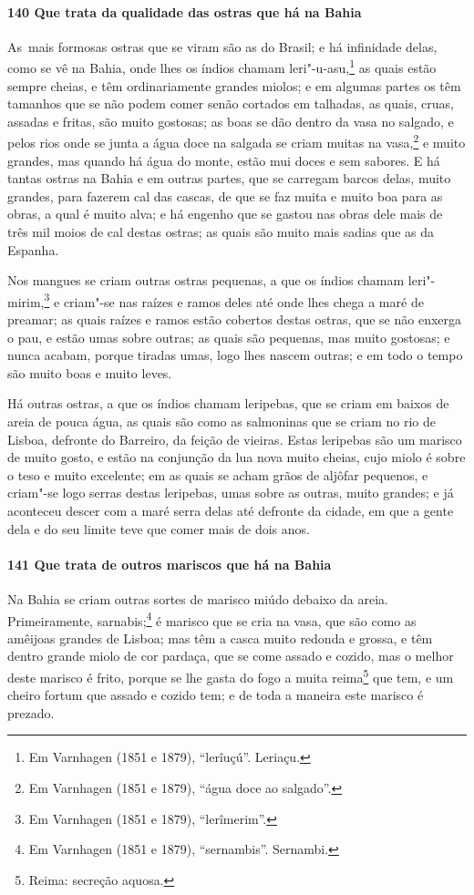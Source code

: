 \begin{linenumbers}
\paragraph{140 Que trata da qualidade das ostras que há na Bahia}\quad
\mbox{As mais} formosas ostras que se viram são as do Brasil; e há infinidade delas, como se vê
na Bahia, onde lhes os índios chamam leri"-u-asu,\footnote{ Em Varnhagen (1851 e 1879),
``lerîuçú''. Leriaçu.} as quais estão sempre cheias, e têm ordinariamente grandes miolos;
e em algumas partes os têm tamanhos que se não podem comer senão cortados em talhadas, as
quais, cruas, assadas e fritas, são muito gostosas; as boas se dão dentro da vasa no
salgado, e pelos rios onde se junta a água doce na salgada se criam muitas na
vasa,\footnote{ Em Varnhagen (1851 e 1879), ``água doce ao salgado''.} e muito grandes,
mas quando há água do monte, estão mui doces e sem sabores. E há tantas ostras na Bahia e
em outras partes, que se carregam barcos delas, muito grandes, para fazerem cal das
cascas, de que se faz muita e muito boa para as obras, a qual é muito alva; e há engenho
que se gastou nas obras dele mais de três mil moios de cal destas ostras; as quais são
muito mais sadias que as da Espanha.

Nos mangues se criam outras ostras pequenas, a que os índios chamam leri"-mirim,\footnote{
Em Varnhagen (1851 e 1879), ``lerîmerim''.} e criam"-se nas raízes e ramos deles até onde
lhes chega a maré de preamar; as quais raízes e ramos estão cobertos destas ostras, que se
não enxerga o pau, e estão umas sobre outras; as quais são pequenas, mas muito gostosas; e
nunca acabam, porque tiradas umas, logo lhes nascem outras; e em todo o tempo são muito
boas e muito leves.

Há outras ostras, a que os índios chamam leripebas, que se criam em baixos de areia de
pouca água, as quais são como as salmoninas que se criam no rio de Lisboa, defronte do
Barreiro, da feição de vieiras. Estas leripebas são um marisco de muito gosto, e estão na
conjunção da lua nova muito cheias, cujo miolo é sobre o teso e muito excelente; em as
quais se acham grãos de aljôfar pequenos, e criam"-se logo serras destas leripebas, umas
sobre as outras, muito grandes; e já aconteceu descer com a maré serra delas até defronte
da cidade, em que a gente dela e do seu limite teve que comer mais de dois anos.

\paragraph{141 Que trata de outros mariscos que há na Bahia}\quad
Na Bahia se criam outras sortes de marisco miúdo debaixo da areia. Primeiramente,
sarnabis;\footnote{ Em Varnhagen (1851 e 1879), ``sernambis''. Sernambi.} é marisco que se
cria na vasa, que são como as amêijoas grandes de Lisboa; mas têm a casca muito redonda e
grossa, e têm dentro grande miolo de cor pardaça, que se come assado e cozido, mas o
melhor deste marisco é frito, porque se lhe gasta do fogo a muita reima\footnote{ Reima:
secreção aquosa.} que tem, e um cheiro fortum que assado e cozido tem; e de
toda a maneira este marisco é prezado.


\end{linenumbers}
